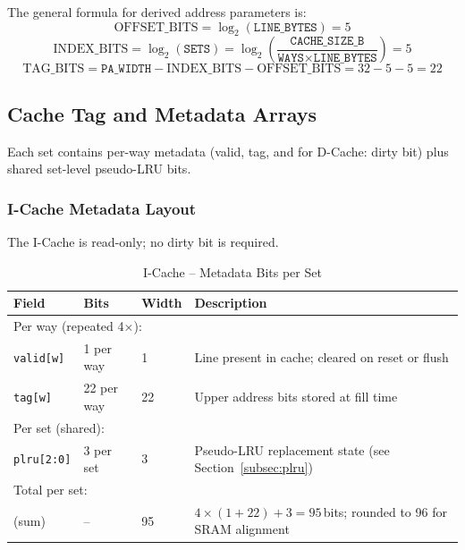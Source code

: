The general formula for derived address parameters is:
\[
  \text{OFFSET\_BITS} = \log_2(\texttt{LINE\_BYTES}) = 5
\]
\[
  \text{INDEX\_BITS}  = \log_2(\texttt{SETS}) = \log_2\!\left(\frac{\texttt{CACHE\_SIZE\_B}}{\texttt{WAYS} \times \texttt{LINE\_BYTES}}\right) = 5
\]
\[
  \text{TAG\_BITS} = \texttt{PA\_WIDTH} - \text{INDEX\_BITS} - \text{OFFSET\_BITS} = 32 - 5 - 5 = 22
\]

\subsection{Cache Tag and Metadata Arrays}

Each set contains per-way metadata (valid, tag, and for D-Cache: dirty bit)
plus shared set-level pseudo-LRU bits.

\subsubsection{I-Cache Metadata Layout}

The I-Cache is read-only; no dirty bit is required.

\begin{table}[H]
\caption{I-Cache -- Metadata Bits per Set}
\label{tab:asICacheTag}
\centering
\begin{tabularx}{\textwidth}{|l |l |l |X|}
  \hline
  Field & Bits & Width & Description \\
  \hline
  \hline
  \multicolumn{4}{|l|}{Per way (repeated 4$\times$):} \\
  \hline
  \texttt{valid[w]}  & 1 per way  & 1  & Line present in cache; cleared on reset or flush \\
  \hline
  \texttt{tag[w]}    & 22 per way & 22 & Upper address bits stored at fill time \\
  \hline
  \multicolumn{4}{|l|}{Per set (shared):} \\
  \hline
  \texttt{plru[2:0]} & 3 per set  & 3  & Pseudo-LRU replacement state (see Section~\ref{subsec:plru}) \\
  \hline
  \multicolumn{4}{|l|}{Total per set:} \\
  \hline
  (sum) & -- & 95 & $4 \times (1+22) + 3 = 95$\,bits; rounded to 96 for SRAM alignment \\
  \hline
\end{tabularx}
\end{table}

